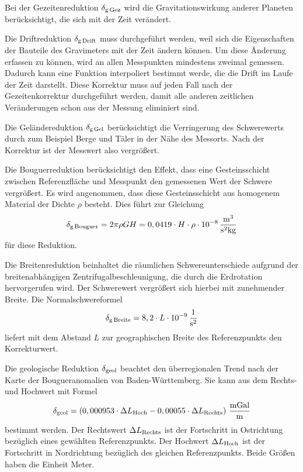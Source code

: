 Bei der Gezeitenreduktion $\delta_{\mathrm{g\,Gez}}$ wird die Gravitationswirkung anderer Planeten berücksichtigt, die sich mit der Zeit verändert.

Die Driftreduktion $\delta_{\mathrm{g\,Drift}}$ muss durchgeführt werden, weil sich die Eigenschaften der Bauteile des Gravimeters mit der Zeit ändern können. Um diese Änderung erfassen zu können, wird an allen Messpunkten mindestens zweimal gemessen. Dadurch kann eine Funktion interpoliert bestimmt werde, die die Drift im Laufe der Zeit darstellt. Diese Korrektur muss auf jeden Fall nach der Gezeitenkorrektur durchgeführt werden, damit alle anderen zeitlichen Veränderungen schon aus der Messung eliminiert sind.

Die Geländereduktion $\delta_{\mathrm{g\,Gel}}$ berücksichtigt die Verringerung des Schwerewerts durch zum Beispiel Berge und Täler in der Nähe des Messorts. Nach der Korrektur ist der Messwert also vergrößert.

Die Bouguerreduktion berücksichtigt den Effekt, dass eine Gesteinsschicht zwischen Referenzfläche und Messpunkt den gemessenen Wert der Schwere vergrößert. Es wird angenommen, dass diese Gesteinsschicht aus homogenem Material der Dichte $\rho$ besteht. Dies führt zur Gleichung
\begin{equation}
 \delta_{\mathrm{g\,Bouguer}}=2\pi\rho GH=0,0419\cdot H\cdot\rho\cdot 10^{-8}\,\frac{\mathrm{m^3}}{\mathrm{s^2kg}}
\end{equation}
für diese Reduktion.

Die Breitenreduktion beinhaltet die räumlichen Schwereunterschiede aufgrund der breitenabhängigen Zentrifugalbeschleunigung, die durch die Erdrotation hervorgerufen wird. Der Schwerewert vergrößert sich hierbei mit zunehmender Breite. Die Normalschwereformel
\begin{equation}
 \delta_{\mathrm{g\,Breite}}=8,2\cdot L\cdot 10^{-9}\,\frac{\mathrm{1}}{\mathrm{s^2}}
\end{equation}
liefert mit dem Abstand $L$ zur geographischen Breite des Referenzpunkts den Korrekturwert.

Die geologische Reduktion $\delta_{\mathrm{geol}}$ beachtet den überregionalen Trend nach der Karte der Bougueranomalien von Baden-Württemberg. Sie kann aus dem Rechts- und Hochwert mit Formel
\begin{equation}
 \delta_{\mathrm{geol}}=\left( 0,000953\cdot \Delta L_{\mathrm{Hoch}} - 0,00055 \cdot \Delta L_{\mathrm{Rechts}} \right) \,\frac{\mathrm{mGal}}{\mathrm{m}}
\end{equation}
bestimmt werden. Der Rechtswert $\Delta L_{\mathrm{Rechts}}$ ist der Fortschritt in Ostrichtung bezüglich eines gewählten Referenzpunkts.
Der Hochwert $\Delta L_{\mathrm{Hoch}}$ ist der Fortschritt in Nordrichtung bezüglich des gleichen Referenzpunkts. Beide Größen haben die Einheit Meter.

